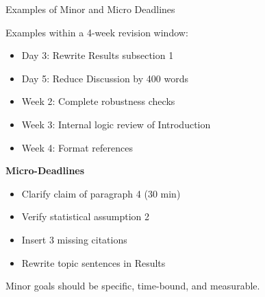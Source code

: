 \documentclass{beamer}
\begin{document}

\begin{frame}{Examples of Minor and Micro Deadlines}

Examples within a 4-week revision window:

\begin{itemize}
    \item Day 3: Rewrite Results subsection 1
    \item Day 5: Reduce Discussion by 400 words
    \item Week 2: Complete robustness checks
    \item Week 3: Internal logic review of Introduction
    \item Week 4: Format references
\end{itemize}

\vspace{0.5em}

\textbf{Micro-Deadlines}
\begin{itemize}
    \item Clarify claim of paragraph 4 (30 min)
    \item Verify statistical assumption 2
    \item Insert 3 missing citations
    \item Rewrite topic sentences in Results
\end{itemize}

Minor goals should be specific, time-bound, and measurable.

\end{frame}






\end{document}
